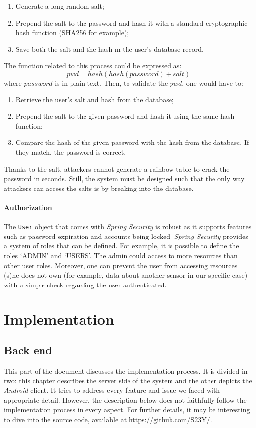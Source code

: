 \documentclass[a4paper, oneside, 11pt]{book}
\newcommand\partcontent{}
\begin{document}
\begin{enumerate}
	\item Generate a long random salt;
	\item Prepend the salt to the password and hash it with a standard cryptographic hash function (SHA256 for example);
	\item Save both the salt and the hash in the user's database record.
\end{enumerate}	
The function related to this process could be expressed as:
\[pwd=hash(hash(password) + salt)\]
where \(password\) is in plain text. Then, to validate the \(pwd\), one would have to:
\begin{enumerate}
	\item Retrieve the user's salt and hash from the database;
	\item Prepend the salt to the given password and hash it using the same hash function;
	\item Compare the hash of the given password with the hash from the database. If they match, the password is correct.
\end{enumerate}

Thanks to the salt, attackers cannot generate a rainbow table to crack the password in seconds. Still, the system must be designed such that the only way attackers can access the salts is by breaking into the database.

\subsection{Authorization}
The \texttt{User} object that comes with \textit{Spring Security} is robust as it supports features such as password expiration and accounts being locked. \textit{Spring Security} provides a system of roles that can be defined. For example, it is possible to define the roles ‘ADMIN’ and ‘USERS’. The admin could access to more resources than other user roles. Moreover, one can prevent the user from accessing resources (s)he does not own (for example, data about another sensor in our specific case) with a simple check regarding the user authenticated.



\part{Implementation}
\renewcommand\partcontent{IMPLEMENTATION: }

\chapter{Back end}
This part of the document discusses the implementation process. It is divided in two: this chapter describes the server side of the system and the other depicts the \textit{Android} client. It tries to address every feature and issue we faced with appropriate detail. However, the description below does not faithfully follow the implementation process in every aspect. For further details, it may be interesting to dive into the source code, available at \url{https://github.com/S23Y/}. \\
\end{document}
